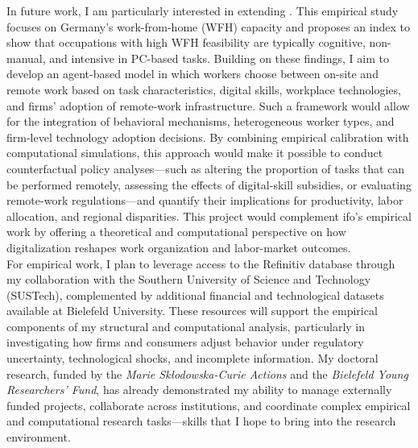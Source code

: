 \documentclass{nfr}
\begin{document}
In future work, I am particularly interested in extending \citet{alipour2023germany}. This empirical study focuses on Germany’s work-from-home (WFH) capacity and proposes an index to show that occupations with high WFH feasibility are typically cognitive, non-manual, and intensive in PC-based tasks. 
Building on these findings, I aim to develop an agent-based model in which workers choose between on-site and remote work based on task characteristics, digital skills, workplace technologies, and firms’ adoption of remote-work infrastructure. 
Such a framework would allow for the integration of behavioral mechanisms, heterogeneous worker types, and firm-level technology adoption decisions. 
By combining empirical calibration with computational simulations, this approach would make it possible to conduct counterfactual policy analyses—such as altering the proportion of tasks that can be performed remotely, assessing the effects of digital-skill subsidies, or evaluating remote-work regulations—and quantify their implications for productivity, labor allocation, and regional disparities. 
This project would complement ifo’s empirical work by offering a theoretical and computational perspective on how digitalization reshapes work organization and labor-market outcomes.\\

For empirical work, I plan to leverage access to the Refinitiv database through my collaboration with the Southern University of Science and Technology (SUSTech), complemented by additional financial and technological datasets available at Bielefeld University. 
These resources will support the empirical components of my structural and computational analysis, particularly in investigating how firms and consumers adjust behavior under regulatory uncertainty, technological shocks, and incomplete information. 
My doctoral research, funded by the \textit{Marie Skłodowska-Curie Actions} and the \textit{Bielefeld Young Researchers’ Fund}, has already demonstrated my ability to manage externally funded projects, collaborate across institutions, and coordinate complex empirical and computational research tasks—skills that I hope to bring into the research environment.\\
\end{document}
